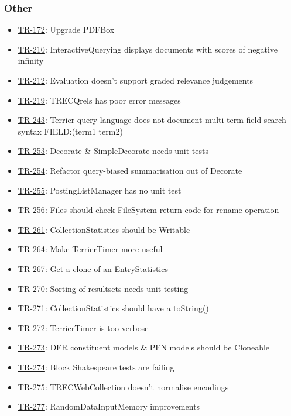 \subsubsection{Other}\label{other-2}

\begin{itemize}
\tightlist
\item
  \href{http://terrier.org/issues/browse/TR-172}{TR-172}: Upgrade PDFBox
\item
  \href{http://terrier.org/issues/browse/TR-210}{TR-210}:
  InteractiveQuerying displays documents with scores of negative
  infinity
\item
  \href{http://terrier.org/issues/browse/TR-212}{TR-212}: Evaluation
  doesn't support graded relevance judgements
\item
  \href{http://terrier.org/issues/browse/TR-219}{TR-219}: TRECQrels has
  poor error messages
\item
  \href{http://terrier.org/issues/browse/TR-243}{TR-243}: Terrier query
  language does not document multi-term field search syntax FIELD:(term1
  term2)
\item
  \href{http://terrier.org/issues/browse/TR-253}{TR-253}: Decorate \&
  SimpleDecorate needs unit tests
\item
  \href{http://terrier.org/issues/browse/TR-254}{TR-254}: Refactor
  query-biased summarisation out of Decorate
\item
  \href{http://terrier.org/issues/browse/TR-255}{TR-255}:
  PostingListManager has no unit test
\item
  \href{http://terrier.org/issues/browse/TR-256}{TR-256}: Files should
  check FileSystem return code for rename operation
\item
  \href{http://terrier.org/issues/browse/TR-261}{TR-261}:
  CollectionStatistics should be Writable
\item
  \href{http://terrier.org/issues/browse/TR-264}{TR-264}: Make
  TerrierTimer more useful
\item
  \href{http://terrier.org/issues/browse/TR-267}{TR-267}: Get a clone of
  an EntryStatistics
\item
  \href{http://terrier.org/issues/browse/TR-270}{TR-270}: Sorting of
  resultsets needs unit testing
\item
  \href{http://terrier.org/issues/browse/TR-271}{TR-271}:
  CollectionStatistics should have a toString()
\item
  \href{http://terrier.org/issues/browse/TR-272}{TR-272}: TerrierTimer
  is too verbose
\item
  \href{http://terrier.org/issues/browse/TR-273}{TR-273}: DFR
  constituent models \& PFN models should be Cloneable
\item
  \href{http://terrier.org/issues/browse/TR-274}{TR-274}: Block
  Shakespeare tests are failing
\item
  \href{http://terrier.org/issues/browse/TR-275}{TR-275}:
  TRECWebCollection doesn't normalise encodings
\item
  \href{http://terrier.org/issues/browse/TR-277}{TR-277}:
  RandomDataInputMemory improvements
\end{itemize}

